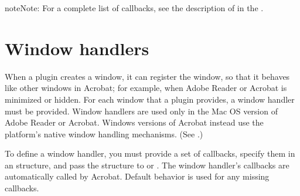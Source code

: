 \documentclass[letterpaper,12pt,english,openany,oneside]{sphinxmanual}
\begin{document}
\begin{sphinxadmonition}{note}{Note:}
For a complete list of callbacks, see the description of  in the .
\end{sphinxadmonition}


\section{Window handlers}
\label{\detokenize{Plugins_Handlers:window-handlers}}
When a plugin creates a window, it can register the window, so that it behaves like other windows in Acrobat; for example, when Adobe Reader or Acrobat is minimized or hidden. For each window that a plugin provides, a window handler must be provided. Window handlers are used only in the Mac OS version of Adobe Reader or Acrobat. Windows versions of Acrobat instead use the platform’s native window handling mechanisms. (See .)

To define a window handler, you must provide a set of callbacks, specify them in an  structure, and pass the structure to  or . The window handler’s callbacks are automatically called by Acrobat. Default behavior is used for any missing callbacks.
\end{document}
